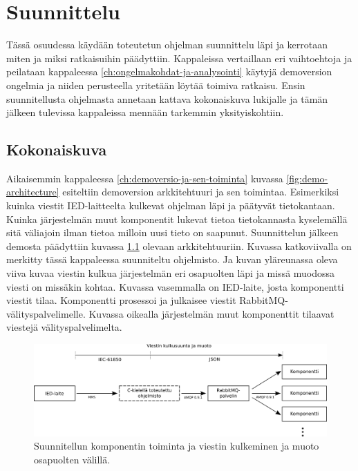 \chapter{Suunnittelu}
\label{ch:suunnittelu}
Tässä osuudessa käydään toteutetun ohjelman suunnittelu läpi ja kerrotaan miten ja miksi ratkaisuihin päädyttiin. Kappaleissa vertaillaan eri vaihtoehtoja ja peilataan kappaleessa \ref{ch:ongelmakohdat-ja-analysointi} käytyjä demoversion ongelmia ja niiden perusteella yritetään löytää toimiva ratkaisu. Ensin suunnitellusta ohjelmasta annetaan kattava kokonaiskuva lukijalle ja tämän jälkeen tulevissa kappaleissa mennään tarkemmin yksityiskohtiin.


\section{Kokonaiskuva}
Aikaisemmin kappaleessa \ref{ch:demoversio-ja-sen-toiminta} kuvassa \ref{fig:demo-architecture} esiteltiin demoversion arkkitehtuuri ja sen toimintaa. Esimerkiksi kuinka viestit IED-laitteelta kulkevat ohjelman läpi ja päätyvät tietokantaan. Kuinka järjestelmän muut komponentit lukevat tietoa tietokannasta kyselemällä sitä väliajoin ilman tietoa milloin uusi tieto on saapunut. Suunnittelun jälkeen demosta päädyttiin kuvassa \ref{fig:planned-system-architecture} olevaan arkkitehtuuriin. Kuvassa katkoviivalla on merkitty tässä kappaleessa suunniteltu ohjelmisto. Ja kuvan yläreunassa oleva viiva kuvaa viestin kulkua järjestelmän eri osapuolten läpi ja missä muodossa viesti on missäkin kohtaa. Kuvassa vasemmalla on IED-laite, josta komponentti viestit tilaa. Komponentti prosessoi ja julkaisee viestit RabbitMQ-välityspalvelimelle. Kuvassa oikealla järjestelmän muut komponenttit tilaavat viestejä välityspalvelimelta.

\begin{figure}[ht!]
	\includegraphics[width=1\textwidth]{pictures/planned-system-architecture.png}
	\caption{Suunnitellun komponentin toiminta ja viestin kulkeminen ja muoto osapuolten välillä.}
	\label{fig:planned-system-architecture}
\end{figure}

